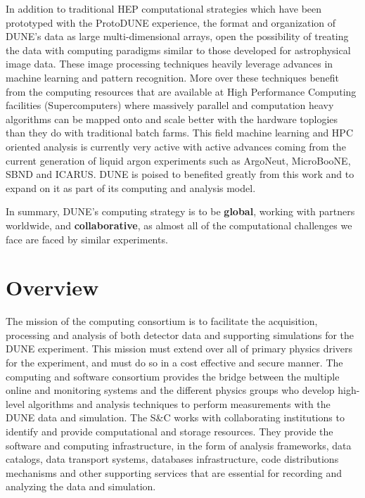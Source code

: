In addition to traditional HEP computational strategies which have been prototyped with the ProtoDUNE experience, the format and organization of DUNE's data as large multi-dimensional arrays, open the possibility of treating the data with computing paradigms similar to those developed for astrophysical image data.  These image processing techniques heavily leverage advances in machine learning and pattern recognition.  More over these techniques benefit from the computing resources that are available at High Performance Computing facilities (Supercomputers) where massively parallel and computation heavy algorithms can be mapped onto and scale better with the hardware toplogies than they do with traditional batch farms.  This field machine learning and HPC oriented analysis is currently very active with active advances coming from the current generation of liquid argon experiments such as ArgoNeut, MicroBooNE, SBND and ICARUS.  DUNE is poised to benefited greatly from this work and to expand on it as part of its computing and analysis model.

In summary, DUNE's computing strategy is to be {\bf global}, working with partners worldwide, and {\bf collaborative}, as almost all of the computational challenges we face are faced by similar experiments. 
 
\section{Overview}
\label{ch:exec-comp-ovr}
The mission of the computing consortium is to facilitate the acquisition, processing and analysis of both detector data and supporting simulations for the DUNE experiment.  This mission must extend over all of primary physics drivers for the experiment, and must do so in a cost effective and secure manner. The computing and software consortium  provides the bridge between the multiple online  and monitoring systems and the different physics groups who develop high-level algorithms and analysis techniques to perform measurements with the DUNE data and simulation. The S\&C works with collaborating institutions to identify and provide computational and storage resources.  They provide the software and computing infrastructure, in the form of analysis frameworks, data catalogs, data transport systems, databases infrastructure, code distributions mechanisms and other supporting services that are essential for recording and analyzing the data and simulation. 

